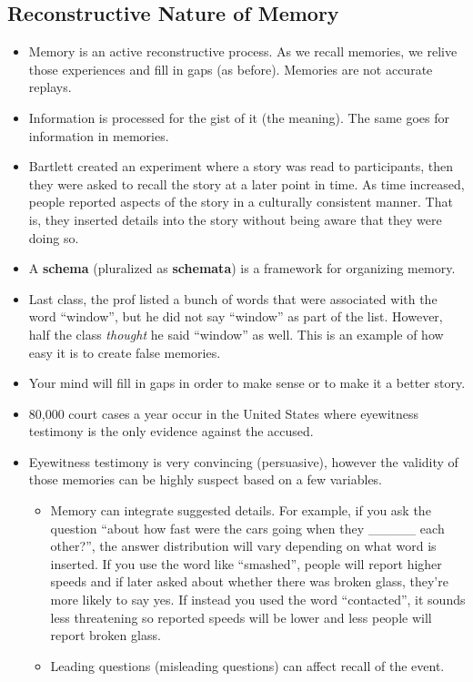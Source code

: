 \documentclass[]{article}
\begin{document}
		\subsection{Reconstructive Nature of Memory}
			\begin{itemize}
				\item Memory is an active reconstructive process. As we recall memories, we relive those experiences and fill in gaps (as before). Memories are not accurate replays.
				\item Information is processed for the gist of it (the meaning). The same goes for information in memories.
				\item Bartlett created an experiment where a story was read to participants, then they were asked to recall the story at a later point in time. As time increased, people reported aspects of the story in a culturally consistent manner. That is, they inserted details into the story without being aware that they were doing so.
				\item A \textbf{schema} (pluralized as \textbf{schemata}) is a framework for organizing memory.
				\item Last class, the prof listed a bunch of words that were associated with the word ``window'', but he did not say ``window'' as part of the list. However, half the class \emph{thought} he said ``window'' as well. This is an example of how easy it is to create false memories.
				\item Your mind will fill in gaps in order to make sense or to make it a better story.
				\item 80,000 court cases a year occur in the United States where eyewitness testimony is the only evidence against the accused.
				\item Eyewitness testimony is very convincing (persuasive), however the validity of those memories can be highly suspect based on a few variables.
					\begin{itemize}
						\item Memory can integrate suggested details. For example, if you ask the question ``about how fast were the cars going when they \_\_\_\_\_ each other?'', the answer distribution will vary depending on what word is inserted. If you use the word like ``smashed'', people will report higher speeds and if later asked about whether there was broken glass, they're more likely to say yes. If instead you used the word ``contacted'', it sounds less threatening so reported speeds will be lower and less people will report broken glass.
						\item Leading questions (misleading questions) can affect recall of the event.

\end{itemize}
\end{itemize}
\end{document}
